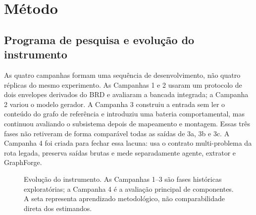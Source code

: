 \documentclass[11pt,a4paper]{article}
\begin{document}
\section{Método}

\subsection{Programa de pesquisa e evolução do instrumento}

As quatro campanhas formam uma sequência de desenvolvimento, não quatro réplicas do mesmo experimento. As Campanhas 1 e 2 usaram um protocolo de dois envelopes derivados do BRD e avaliaram a bancada integrada; a Campanha 2 variou o modelo gerador. A Campanha 3 construiu a entrada sem ler o conteúdo do grafo de referência e introduziu uma bateria comportamental, mas continuou avaliando o subsistema depois de mapeamento e montagem. Essas três fases não retiveram de forma comparável todas as saídas de 3a, 3b e 3c. A Campanha 4 foi criada para fechar essa lacuna: usa o contrato multi-problema da rota legada, preserva saídas brutas e mede separadamente agente, extrator e GraphForge.

\begin{figure}[tbp]
\centering
{}
\caption{Evolução do instrumento. As Campanhas 1--3 são fases históricas exploratórias; a Campanha 4 é a avaliação principal de componentes. A seta representa aprendizado metodológico, não comparabilidade direta dos estimandos.}
\label{fig:timeline}
\end{figure}
\FloatBarrier
\end{document}
